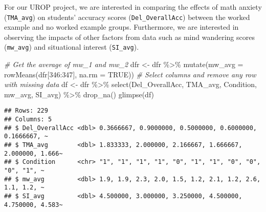 \documentclass[
]{article}
\newenvironment{Shaded}{\begin{snugshade}}{\end{snugshade}}
\newcommand{\AttributeTok}[1]{\textcolor[rgb]{0.77,0.63,0.00}{#1}}
\newcommand{\CommentTok}[1]{\textcolor[rgb]{0.56,0.35,0.01}{\textit{#1}}}
\newcommand{\ConstantTok}[1]{\textcolor[rgb]{0.00,0.00,0.00}{#1}}
\newcommand{\DecValTok}[1]{\textcolor[rgb]{0.00,0.00,0.81}{#1}}
\newcommand{\FunctionTok}[1]{\textcolor[rgb]{0.00,0.00,0.00}{#1}}
\newcommand{\NormalTok}[1]{#1}
\newcommand{\OtherTok}[1]{\textcolor[rgb]{0.56,0.35,0.01}{#1}}
\newcommand{\SpecialCharTok}[1]{\textcolor[rgb]{0.00,0.00,0.00}{#1}}
\begin{document}
\begin{Shaded}
\end{Shaded}

For our UROP project, we are interested in comparing the effects of math
anxiety (\texttt{TMA\_avg}) on students' accuracy scores
(\texttt{Del\_OverallAcc}) between the worked example and no worked
example groups. Furthermore, we are interested in observing the impacts
of other factors from data such as mind wandering scores
(\texttt{mw\_avg}) and situational interest (\texttt{SI\_avg}).

\begin{Shaded}
\begin{Highlighting}[]
\CommentTok{\# Get the average of mw\_1 and mw\_2}
\NormalTok{dfr }\OtherTok{\textless{}{-}}\NormalTok{ dfr }\SpecialCharTok{\%\textgreater{}\%} \FunctionTok{mutate}\NormalTok{(}\AttributeTok{mw\_avg =} \FunctionTok{rowMeans}\NormalTok{(dfr[}\DecValTok{346}\SpecialCharTok{:}\DecValTok{347}\NormalTok{], }\AttributeTok{na.rm =} \ConstantTok{TRUE}\NormalTok{))}
\CommentTok{\# Select columns and remove any row with missing data}
\NormalTok{df }\OtherTok{\textless{}{-}}\NormalTok{ dfr }\SpecialCharTok{\%\textgreater{}\%} \FunctionTok{select}\NormalTok{(Del\_OverallAcc, TMA\_avg, Condition, mw\_avg, SI\_avg) }\SpecialCharTok{\%\textgreater{}\%} 
  \FunctionTok{drop\_na}\NormalTok{()}
\FunctionTok{glimpse}\NormalTok{(df)}
\end{Highlighting}
\end{Shaded}

\begin{verbatim}
## Rows: 229
## Columns: 5
## $ Del_OverallAcc <dbl> 0.3666667, 0.9000000, 0.5000000, 0.6000000, 0.1666667, ~
## $ TMA_avg        <dbl> 1.833333, 2.000000, 2.166667, 1.666667, 2.000000, 1.666~
## $ Condition      <chr> "1", "1", "1", "1", "0", "1", "1", "0", "0", "0", "1", ~
## $ mw_avg         <dbl> 1.9, 1.9, 2.3, 2.0, 1.5, 1.2, 2.1, 1.2, 2.6, 1.1, 1.2, ~
## $ SI_avg         <dbl> 4.500000, 3.000000, 3.250000, 4.500000, 4.750000, 4.583~
\end{verbatim}
\end{document}
